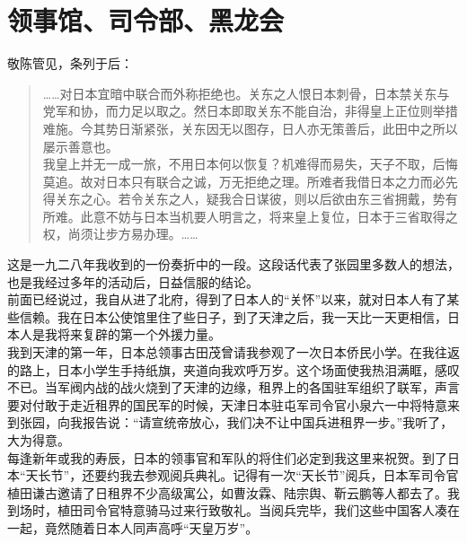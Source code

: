 \fancyhead[RO]{} %
\fancyhead[LE]{} %
\chapter*{领事馆、司令部、黑龙会}
\thispagestyle{empty}
敬陈管见，条列于后：\\

\begin{quote}
	……对日本宜暗中联合而外称拒绝也。关东之人恨日本刺骨，日本禁关东与党军和协，而力足以取之。然日本即取关东不能自治，非得皇上正位则举措难施。今其势日渐紧张，关东因无以图存，日人亦无策善后，此田中之所以屡示善意也。\\

我皇上并无一成一旅，不用日本何以恢复？机难得而易失，天子不取，后悔莫追。故对日本只有联合之诚，万无拒绝之理。所难者我借日本之力而必先得关东之心。若令关东之人，疑我合日谋彼，则以后欲由东三省拥戴，势有所难。此意不妨与日本当机要人明言之，将来皇上复位，日本于三省取得之权，尚须让步方易办理。……\\
\end{quote}

这是一九二八年我收到的一份奏折中的一段。这段话代表了张园里多数人的想法，也是我经过多年的活动后，日益信服的结论。\\

前面已经说过，我自从进了北府，得到了日本人的“关怀”以来，就对日本人有了某些信赖。我在日本公使馆里住了些日子，到了天津之后，我一天比一天更相信，日本人是我将来复辟的第一个外援力量。\\

我到天津的第一年，日本总领事古田茂曾请我参观了一次日本侨民小学。在我往返的路上，日本小学生手持纸旗，夹道向我欢呼万岁。这个场面使我热泪满眶，感叹不已。当军阀内战的战火烧到了天津的边缘，租界上的各国驻军组织了联军，声言要对付敢于走近租界的国民军的时候，天津日本驻屯军司令官小泉六一中将特意来到张园，向我报告说：“请宣统帝放心，我们决不让中国兵进租界一步。”我听了，大为得意。\\

每逢新年或我的寿辰，日本的领事官和军队的将住们必定到我这里来祝贺。到了日本“天长节”，还要约我去参观阅兵典礼。记得有一次“天长节”阅兵，日本军司令官植田谦古邀请了日租界不少高级寓公，如曹汝霖、陆宗舆、靳云鹏等人都去了。我到场时，植田司令官特意骑马过来行致敬礼。当阅兵完毕，我们这些中国客人凑在一起，竟然随着日本人同声高呼“天皇万岁”。\\

